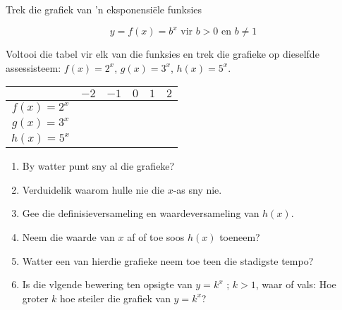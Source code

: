 \begin{wex}{Trek die grafiek van 'n eksponensiële funksies}
 {
\begin{equation*} y=f(x) =b^{x} \mbox{ vir } b>0 \mbox{ en } b \neq 1 \end{equation*}

Voltooi die tabel vir elk van die funksies en trek die grafieke op dieselfde assessisteem:
$f(x)=2^{x}$, $g(x)=3^{x}$, $h(x)=5^{x}$.

\begin{table}[H]
\begin{center}
\begin{tabular}{|c|c|c|c|c|c|}
\hline
   &  $-2$ & $-1$ & $0$ & $1$ & $2$ 
\\ \hline
 $f(x)=2^{x}$& \hspace{1cm}   & \hspace{1cm} & \hspace{1cm} & \hspace{1cm} & \hspace{1cm} 
\\ \hline
 $g(x)=3^{x}$&  &&&&
\\ \hline
 $h(x)=5^{x}$&  &&&&
\\ \hline

\end{tabular}
\end{center}
\end{table}

\begin{enumerate}[noitemsep, label=\textbf{\arabic*}. ] 
\item By watter punt sny al die grafieke?
\item Verduidelik waarom hulle nie die $x$-as sny nie.
\item Gee die definisieversameling en waardeversameling van $h(x)$.
\item Neem die waarde van $x$ af of toe soos $h(x)$ toeneem?
\item Watter een van hierdie grafieke neem toe teen die stadigste tempo?
\item Is die vlgende bewering ten opsigte van $y=k^{x}$ ; $k>1$, waar of vals: Hoe groter $k$ hoe steiler die grafiek van $y=k^{x}$?
\end{enumerate}

}
\end{wex}

